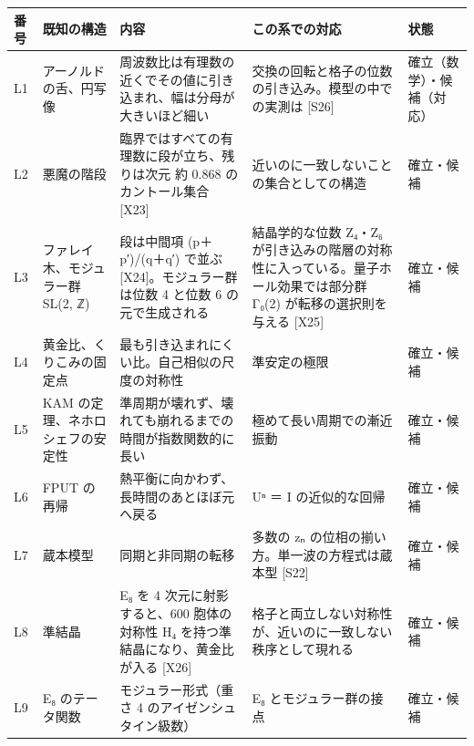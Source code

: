 \documentclass[
  a4paper,
]{ltjsarticle}
\newcounter{none} %
\begin{document}
{\def\LTcaptype{none} %
\begin{longtable}[]{@{}
  >{\raggedright\arraybackslash}p{}
  >{\raggedright\arraybackslash}p{}
  >{\raggedright\arraybackslash}p{}
  >{\raggedright\arraybackslash}p{}
  >{\raggedright\arraybackslash}p{}@{}}
\toprule\noalign{}
\begin{minipage}[b]{\linewidth}\raggedright
番号
\end{minipage} & \begin{minipage}[b]{\linewidth}\raggedright
既知の構造
\end{minipage} & \begin{minipage}[b]{\linewidth}\raggedright
内容
\end{minipage} & \begin{minipage}[b]{\linewidth}\raggedright
この系での対応
\end{minipage} & \begin{minipage}[b]{\linewidth}\raggedright
状態
\end{minipage} \\
\midrule\noalign{}
\endhead
\bottomrule\noalign{}
\endlastfoot
L1 & アーノルドの舌、円写像 &
周波数比は有理数の近くでその値に引き込まれ、幅は分母が大きいほど細い &
交換の回転と格子の位数の引き込み。模型の中での実測は {[}S26{]} &
確立（数学）・候補（対応） \\
L2 & 悪魔の階段 & 臨界ではすべての有理数に段が立ち、残りは次元 約 0.868
のカントール集合 {[}X23{]} & 近いのに一致しないことの集合としての構造 &
確立・候補 \\
L3 & ファレイ木、モジュラー群 SL(2, ℤ) & 段は中間項 (p＋p′)/(q＋q′)
で並ぶ {[}X24{]}。モジュラー群は位数 4 と位数 6 の元で生成される &
結晶学的な位数 Z₄・Z₆
が引き込みの階層の対称性に入っている。量子ホール効果では部分群 Γ₀(2)
が転移の選択則を与える {[}X25{]} & 確立・候補 \\
L4 & 黄金比、くりこみの固定点 &
最も引き込まれにくい比。自己相似の尺度の対称性 & 準安定の極限 &
確立・候補 \\
L5 & KAM の定理、ネホロシェフの安定性 &
準周期が壊れず、壊れても崩れるまでの時間が指数関数的に長い &
極めて長い周期での漸近振動 & 確立・候補 \\
L6 & FPUT の再帰 & 熱平衡に向かわず、長時間のあとほぼ元へ戻る & Uⁿ ＝ I
の近似的な回帰 & 確立・候補 \\
L7 & 蔵本模型 & 同期と非同期の転移 & 多数の zₙ
の位相の揃い方。単一波の方程式は蔵本型 {[}S22{]} & 確立・候補 \\
L8 & 準結晶 & E₈ を 4 次元に射影すると、600 胞体の対称性 H₄
を持つ準結晶になり、黄金比が入る {[}X26{]} &
格子と両立しない対称性が、近いのに一致しない秩序として現れる &
確立・候補 \\
L9 & E₈ のテータ関数 & モジュラー形式（重さ 4 のアイゼンシュタイン級数）
& E₈ とモジュラー群の接点 & 確立・候補 \\
\end{longtable}
}
\end{document}
